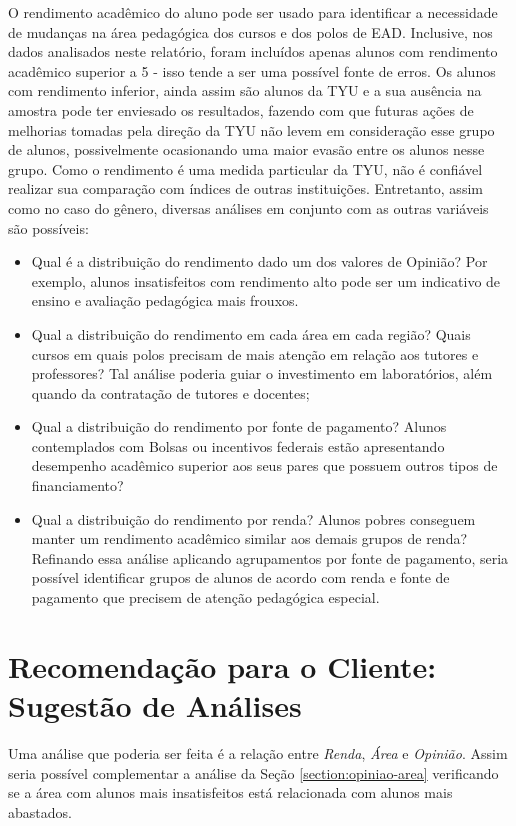\documentclass[10pt,a4paper,oneside]{article}
\begin{document}
O rendimento acadêmico do aluno pode ser usado para identificar a necessidade de mudanças na área pedagógica dos cursos e dos polos de EAD. Inclusive, nos dados analisados neste relatório, foram incluídos apenas alunos com rendimento acadêmico superior a 5 - isso tende a ser uma possível fonte de erros. Os alunos com rendimento inferior, ainda assim são alunos da TYU e a sua ausência na amostra pode ter enviesado os resultados, fazendo com que futuras ações de melhorias tomadas pela direção da TYU não levem em consideração esse grupo de alunos, possivelmente ocasionando uma maior evasão entre os alunos nesse grupo. Como o rendimento é uma medida particular da TYU, não é confiável realizar sua comparação com índices de outras instituições. Entretanto, assim como no caso do gênero, diversas análises em conjunto com as outras variáveis são possíveis:
\begin{itemize}
	\item Qual é a distribuição do rendimento dado um dos valores de Opinião? Por exemplo, alunos insatisfeitos com rendimento alto pode ser um indicativo de ensino e avaliação pedagógica mais frouxos.
	\item Qual a distribuição do rendimento em cada área em cada região? Quais cursos em quais polos precisam de mais atenção em relação aos tutores e professores? Tal análise poderia guiar o investimento em laboratórios, além quando da contratação de tutores e docentes;
	\item Qual a distribuição do rendimento por fonte de pagamento? Alunos contemplados com Bolsas ou incentivos federais estão apresentando desempenho acadêmico superior aos seus pares que possuem outros tipos de financiamento? 
	\item Qual a distribuição do rendimento por renda? Alunos pobres conseguem manter um rendimento acadêmico similar aos demais grupos de renda? Refinando essa análise aplicando agrupamentos por fonte de pagamento, seria possível identificar grupos de alunos de acordo com renda e fonte de pagamento que precisem de atenção pedagógica especial.
\end{itemize}

\FloatBarrier
\section{Recomendação para o Cliente: Sugestão de Análises}
\label{section:sugestao}

Uma análise que poderia ser feita é a relação entre \textit{Renda}, \textit{Área} e \textit{Opinião}. Assim seria possível complementar a análise da Seção \ref{section:opiniao-area} verificando se a área com alunos mais insatisfeitos está relacionada com alunos mais abastados.
\end{document}
